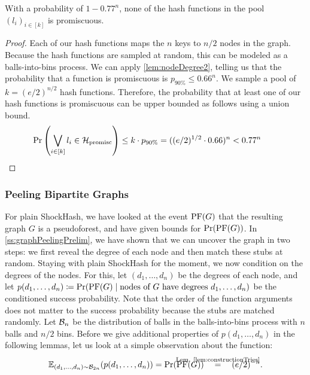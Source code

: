 \documentclass[a4paper,USenglish,cleveref]{lipics-v2021}
\def\refRelLem#1#2{\stackrel{\mathclap{\text{Lem. \ref{#1}}}}{#2}\quad}
\begin{document}
\begin{lemma}
  With a probability of $1 - 0.77^n$, none of the hash functions in the pool $(l_i)_{i\in[k]}$ is promiscuous.
  \label{lem:eventPoolNodeDegree2}
\end{lemma}
\begin{proof}
  Each of our hash functions maps the $n$ keys to $n/2$ nodes in the graph.
  Because the hash functions are sampled at random, this can be modeled as a balls-into-bins process.
  We can apply \cref{lem:nodeDegree2}, telling us that the probability that a function is promiscuous is $p_{90\%} \leq 0.66^n$.
  We sample a pool of $k=(e/2)^{n/2}$ hash functions.
  Therefore, the probability that at least one of our hash functions is promiscuous can be upper bounded as follows using a union bound.
  \begin{align*}
    \Pr\left(\bigvee_{i\in[k]} l_i \in \mathcal{H}_{\textrm{promisc}}\right)
      \leq k \cdot p_{90\%}
      = ((e/2)^{1/2} \cdot 0.66)^n
      < 0.77^n
    \tag*{\qedhere}
  \end{align*}
\end{proof}

\subsubsection{Peeling Bipartite Graphs} \label{sec:peelingBipartite}
For plain ShockHash, we have looked at the event $\mathrm{PF}(G)$ that the resulting graph $G$ is a pseudoforest, and have given bounds for $\Pr(\mathrm{PF}(G))$.
In \cref{ss:graphPeelingPrelim}, we have shown that we can uncover the graph in two steps: we first reveal the degree of each node and then match these stubs at random.
Staying with plain ShockHash for the moment, we now condition on the degrees of the nodes.
For this, let $(d_1,\ldots,d_n)$ be the degrees of each node, and let $p(d_1, \ldots, d_n) \coloneqq \Pr(\mathrm{PF}(G) \mid \textrm{nodes of $G$ have degrees $d_1, \ldots, d_n$})$ be the conditioned success probability.
Note that the order of the function arguments does not matter to the success probability because the stubs are matched randomly.
Let $\mathcal{B}_n$ be the distribution of balls in the balls-into-bins process with $n$ balls and $n/2$ bins.
Before we give additional properties of $p(d_1, \ldots, d_n)$ in the following lemmas, let us look at a simple observation about the function:
\begin{align}
  \expect_{(d_1, \ldots, d_n) \sim \B_{2n}}(p(d_1, \ldots, d_n))
    = \Pr(\PF(G))
    \quad\refRelLem{lem:constructionTries}{=} (e/2)^{-n}.
  \label{obs:expectP}
\end{align}
\end{document}

